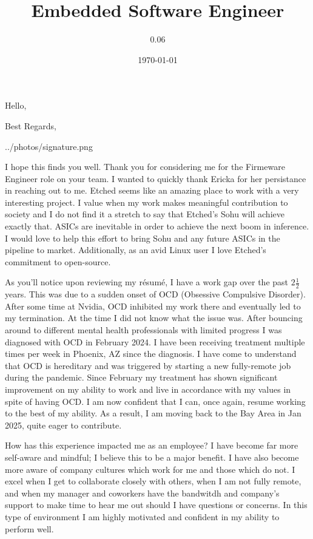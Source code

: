 \documentclass[11pt,a4paper,sans]{moderncv}        %
\title{Embedded Software Engineer}                               %
\begin{document}
\date{\today}
\subject{Firmware Engineer}
\opening{Hello,}
\closing{Best Regards,}
\signature{0.06}{../photos/signature.png}                     %
\makelettertitle

I hope this finds you well. Thank you for considering me for the Firmeware Engineer role on your team. I wanted to quickly thank Ericka for her persistance in reaching out to me. Etched seems like an amazing place to work with a very interesting project. I value when my work makes meaningful contribution to society and I do not find it a stretch to say that Etched's Sohu will achieve exactly that. ASICs are inevitable in order to achieve the next boom in inference. I would love to help this effort to bring Sohu and any future ASICs in the pipeline to market. Additionally, as an avid Linux user I love Etched's commitment to open-source.

As you'll notice upon reviewing my r\'esum\'e, I have a work gap over the past $2\frac{1}{2}$ years. This was due to a sudden onset of OCD (Obsessive Compulsive Disorder). After some time at Nvidia, OCD inhibited my work there and eventually led to my termination. At the time I did not know what the issue was. After bouncing around to different mental health professionals with limited progress I was diagnosed with OCD in February 2024. I have been receiving treatment multiple times per week in Phoenix, AZ since the diagnosis. I have come to understand that OCD is hereditary and was triggered by starting a new fully-remote job during the pandemic. Since February my treatment has shown significant improvement on my ability to work and live in accordance with my values in spite of having OCD. I am now confident that I can, once again, resume working to the best of my ability. As a result, I am moving back to the Bay Area in Jan 2025, quite eager to contribute.

How has this experience impacted me as an employee? I have become far more self-aware and mindful; I believe this to be a major benefit. I have also become more aware of company cultures which work for me and those which do not. I excel when I get to collaborate closely with others, when I am not fully remote, and when my manager and coworkers have the bandwitdh and company's support to make time to hear me out should I have questions or concerns. In this type of environment I am highly motivated and confident in my ability to perform well.
\end{document}

